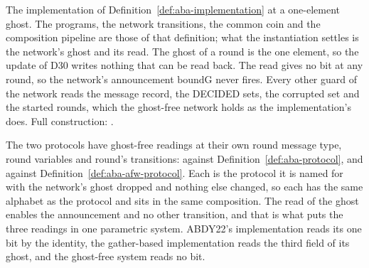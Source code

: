 \begin{definition}
  \label{def:aba-ghost-free}
  \leanok
  The implementation of Definition~\ref{def:aba-implementation} at a one-element ghost.
  The programs, the network transitions, the common coin and the composition pipeline are those of that definition; what the instantiation settles is the network's ghost and its read.
  The ghost of a round is the one element, so the update of D30 writes nothing that can be read back.
  The read gives no bit at any round, so the network's announcement $\mathrm{boundG}$ never fires.
  Every other guard of the network reads the message record, the DECIDED sets, the corrupted set and the started rounds, which the ghost-free network holds as the implementation's does.
  Full construction: .

  The two protocols have ghost-free readings at their own round message type, round variables and round's transitions:  against Definition~\ref{def:aba-protocol}, and  against Definition~\ref{def:aba-afw-protocol}.
  Each is the protocol it is named for with the network's ghost dropped and nothing else changed, so each has the same alphabet as the protocol and sits in the same composition.
  The read of the ghost enables the announcement and no other transition, and that is what puts the three readings in one parametric system.
  ABDY22's implementation reads its one bit by the identity, the gather-based implementation reads the third field of its ghost, and the ghost-free system reads no bit.
\end{definition}

